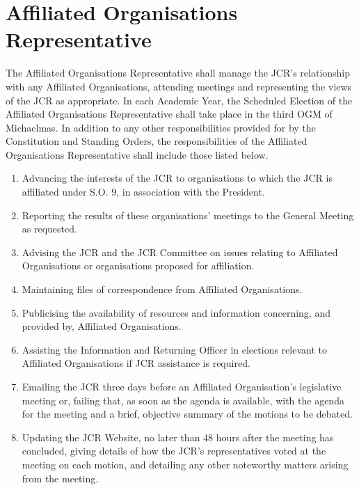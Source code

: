 \section{Affiliated Organisations Representative}
\npara The Affiliated Organisations Representative shall manage the JCR's relationship with any Affiliated Organisations, attending meetings and representing the views of the JCR as appropriate.
\npara In each Academic Year, the Scheduled Election of the Affiliated Organisations Representative shall take place in the third OGM of Michaelmas.
\npara In addition to any other responsibilities provided for by the Constitution and Standing Orders, the responsibilities of the Affiliated Organisations Representative shall include those listed below.
\begin{enumerate}
	\item Advancing the interests of the JCR to organisations to which the JCR is affiliated under S.O. 9, in association with the President.     
	\item Reporting the results of these organisations' meetings to the General Meeting as requested.
	\item Advising the JCR and the JCR Committee on issues relating to Affiliated Organisations or organisations proposed for affiliation.
	\item Maintaining files of correspondence from Affiliated Organisations.     
	\item Publicising the availability of resources and information concerning, and provided by, Affiliated Organisations.
	\item Assisting the Information and Returning Officer in elections relevant to Affiliated Organisations if JCR assistance is required.
	\item Emailing the JCR three days before an Affiliated Organisation's legislative meeting or, failing that, as soon as the agenda is available, with the agenda for the meeting and a brief, objective summary of the motions to be debated.
	\item Updating the JCR Website, no later than 48 hours after the meeting has concluded, giving details of how the JCR's representatives voted at the meeting on each motion, and detailing any other noteworthy matters arising from the meeting.
\end{enumerate}
